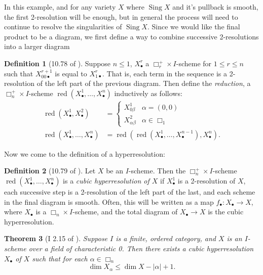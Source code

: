 \documentclass[proquest]{uwthesis}[2014/11/13]
\newtheorem{theorem}{Theorem}[section]
\theoremstyle{definition}
\newtheorem{definition}[theorem]{Definition}
\DeclareMathOperator{\Sing}{Sing}
\DeclareMathOperator{\red}{red}
\begin{document}
In this example, and for any variety $X$ where $\Sing X$ and it's pullback is smooth, the first 2-resolution will be enough, but in general the process will need to continue to resolve the singularities of $\Sing X$.
Since we would like the final product to be a diagram, we first define a way to combine successive 2-resolutions into a larger diagram

\begin{definition}[10.78 of \cite{Kollar2013}]
	Suppose $n \leq 1$, $X^r_\bullet$ a $\Box^+_r \times I$-scheme for $1 \leq r \leq n$ such that $X_{00\bullet}^{r+1}$ is equal to $X_{1\bullet}^r$.
	That is, each term in the sequence is a 2-resolution of the left part of the previous diagram.
	Then define the {\it reduction}, a $\Box_n^+ \times I$-scheme $\red(X_\bullet^1, \dots, X_\bullet^n)$ inductively as follows:
	\begin{align*}
		\red(X_\bullet^1, X_\bullet^2) &= 
		\begin{cases}
			X^1_{0\beta} & \alpha = (0,0) \\
			X^2_{\alpha\beta} & \alpha \in \Box_1
		\end{cases} \\
		\red(X_\bullet^1, \dots, X_\bullet^n) &= \red(\red(X_\bullet^1, \dots, X_\bullet^{n-1}), X^n_\bullet).
	\end{align*}
\end{definition}

Now we come to the definition of a hyperresolution:

\begin{definition}[10.79 of \cite{Kollar2013}]
	Let $X$ be an $I$-scheme.
	Then the $\Box_n^+ \times I$-scheme $\red(X_\bullet^1, \dots, X_\bullet^n)$ is a {\it cubic hyperresolution of $X$} if $X_\bullet^1$ is a 2-resolution of $X$, each successive step is a 2-resolution of the left part of the last, and each scheme in the final diagram is smooth.
	Often, this will be written as a map $f_\bullet : X_\bullet \rightarrow X$, where $X_\bullet$ is a $\Box_n \times I$-scheme, and the total diagram of $X_\bullet \rightarrow X$ is the cubic hyperresolution.
\end{definition}

\begin{theorem}[I 2.15 of \cite{Guillen1988}]
	\label{thm:hyperexist}
	Suppose $I$ is a finite, ordered category, and $X$ is an $I$-scheme over a field of characteristic 0.
	Then there exists a cubic hyperresolution $X_\bullet$ of $X$ such that for each $\alpha \in \Box_n$
	\[
	\dim X_\alpha \leq \dim X - |\alpha| + 1.
	\]
\end{theorem}
\end{document}
